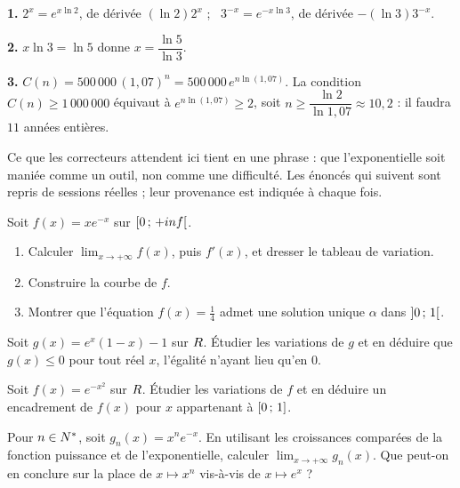 \begin{corrige}
\textbf{1.} $2^{x} = e^{x\ln 2}$, de dérivée $(\ln 2)2^{x}$ ; \
$3^{-x} = e^{-x\ln 3}$, de dérivée $-(\ln 3)3^{-x}$.

\textbf{2.} $x\ln 3 = \ln 5$ donne $x = \dfrac{\ln 5}{\ln 3}$.

\textbf{3.} $C(n) = 500\,000\,(1{,}07)^{n} = 500\,000\,e^{n\ln(1{,}07)}$.
La condition $C(n) \geq 1\,000\,000$ équivaut à $e^{n\ln(1{,}07)} \geq 2$,
soit $n \geq \dfrac{\ln 2}{\ln 1{,}07} \approx 10{,}2$ : il faudra $11$
années entières.
\end{corrige}

\begin{annales}
Ce que les correcteurs attendent ici tient en une phrase : que l'exponentielle
soit maniée comme un outil, non comme une difficulté. Les énoncés qui suivent
sont repris de sessions réelles ; leur provenance est indiquée à chaque fois.

Soit $f(x) = xe^{-x}$ sur $\left[0\,;\,+inf\right[$.
\begin{enumerate}[label=\textbf{\arabic*)}, leftmargin=*, itemsep=0.15em]
  \item Calculer $\lim_{x\to+\infty}f(x)$, puis $f'(x)$, et dresser le tableau
        de variation.
  \item Construire la courbe de $f$.
  \item Montrer que l'équation $f(x) = \frac14$ admet une solution unique
        $\alpha$ dans $\left]0\,;\,1\right[$.
\end{enumerate}

Soit $g(x) = e^{x}(1-x)-1$ sur $R$. Étudier les variations de $g$ et en
déduire que $g(x) \leq 0$ pour tout réel $x$, l'égalité n'ayant lieu qu'en
$0$.

Soit $f(x) = e^{-x^{2}}$ sur $R$. Étudier les variations de $f$ et en déduire
un encadrement de $f(x)$ pour $x$ appartenant à $\left[0\,;\,1\right]$.

Pour $n\in N^{*}$, soit $g_{n}(x) = x^{n}e^{-x}$. En utilisant les
croissances comparées de la fonction puissance et de l'exponentielle,
calculer $\lim_{x\to+\infty}g_{n}(x)$. Que peut-on en conclure sur la place de
$x \mapsto x^{n}$ vis-à-vis de $x \mapsto e^{x}$ ?


\end{annales}
